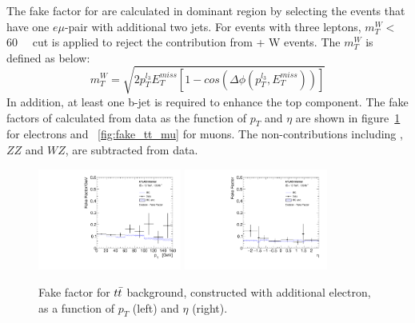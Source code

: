 The fake factor for \ttbar are calculated in \ttbar dominant region by selecting the events that have one $e\mu$-pair with additional two jets.
For events with three leptons, $m_{T}^{W} <$ 60~\gev~ cut is applied to reject the contribution from \ttbar + W events.
The $m_{T}^{W}$ is defined as below:
\begin{equation}
	m_{T}^{W} = \sqrt{ 2p_{T}^{l_{3}} E_{T}^{miss} \left[1-cos\left(\Delta\phi\left(p_{T}^{l_{3}}, E_{T}^{miss}\right)\right)\right] }
\end{equation}
In addition, at least one b-jet is required to enhance the top component.
The fake factors of \ttbar calculated from data as the function of $p_{T}$ and $\eta$ are shown in figure~\ref{fig:fake_tt_el} for electrons and ~\ref{fig:fake_tt_mu} for muons.
The non-\ttbar contributions including \Zjet, $ZZ$ and $WZ$, are subtracted from data.
\begin{figure}[!htb]
  \centering
  \includegraphics[width=0.42\textwidth]{figures/VBSZZ/fakebkg/Electron_2Dff_ptttbarFakeFactorAddElectron_etapt_pavgy.pdf}
  \includegraphics[width=0.42\textwidth]{figures/VBSZZ/fakebkg/Electron_2Dff_etattbarFakeFactorAddElectron_etapt_pavgx.pdf}
  \caption{Fake factor for $t\bar{t}$ background, constructed with additional electron, as a function of $p_{T}$ (left) and $\eta$ (right).}
  \label{fig:fake_tt_el}
\end{figure}


